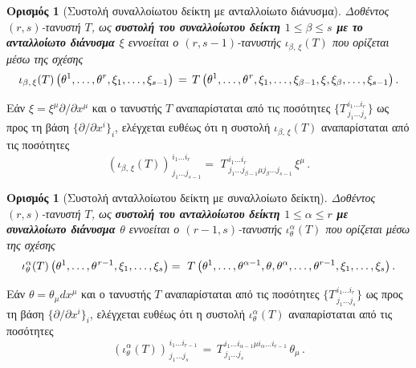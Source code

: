\documentclass[11pt,a4paper,twoside,openright]{book}
\newtheorem{definition}[lemma]{Ορισμός}
\begin{document}
\begin{definition}[Συστολή συναλλοίωτου δείκτη με ανταλλοίωτο διάνυσμα]
	\label{def:interior-product}
Δοθέντος $(r,s)$-τανυστή $T$, ως \textbf{συστολή του συναλλοίωτου δείκτη $1 \le \beta \le s$ με το ανταλλοίωτο διάνυσμα $\xi$} εννοείται ο $(r, s-1)$-τανυστής $\iota_{\beta,\,\xi}(T)$ που ορίζεται μέσω της σχέσης
\begin{equation}\label{eq:interior-product}
\iota_{\beta,\,\xi}(T)
\left(
\theta^1, \dots, \theta^r, \xi_1, \dots, \xi_{s-1}
\right)
\,=\,
T
\left(
\theta^1, \dots, \theta^{\hspace{.5pt}r},
\xi_1, \dots, \xi_{\beta-1}, \xi, \xi_{\beta}, \dots, \xi_{s-1}
\right).
\end{equation}
\end{definition}
\noindent
Εάν $\xi = \xi^\mu \partial/\partial x^\mu$ και ο τανυστής $T$ αναπαρίσταται από τις ποσότητες $\{T^{\,i_1 \dots i_r}_{\,j_1 \dots j_s}\}$ ως προς τη βάση $\{\partial/\partial x^i\}_i$, ελέγχεται ευθέως ότι η συστολή
$\iota_{\beta,\,\xi}(T)$ αναπαρίσταται από τις ποσότητες
\begin{equation}\label{eq:interior-product-representation}
(\iota_{\beta,\,\xi}(T))^{\,i_1 \dots i_r}_{\,j_1 \dots j_{s-1}}
=\,\,
T^{\,i_1 \dots i_r}_{\,j_1 \dots j_{\beta-1} \mu j_{\beta} \dots j_{s-1}}
\,
\xi^\mu\,.
\end{equation}

\begin{definition}[Συστολή ανταλλοίωτου δείκτη με συναλλοίωτο δείκτη]
	\label{def:interior-product-dual}
Δοθέντος $(r,s)$-τανυστή $T$, ως \textbf{συστολή του ανταλλοίωτου δείκτη $1 \le \alpha \le r$ με συναλλοίωτο διάνυσμα $\theta$} εννοείται ο $(r-1, s)$-τανυστής $\iota^\alpha_\theta(T)$ που ορίζεται μέσω της σχέσης
\begin{equation}\label{eq:interior-product-dual-representation}
\iota^\alpha_\theta(T)
\left(
\theta^1, \dots, \theta^{\hspace{.5pt}r-1}, \xi_1, \dots, \xi_s
\right)
=\,\,
T
\left(
\theta^1, \dots, \theta^{\alpha-1}, \theta, \theta^{\alpha}, \dots, \theta^{r-1},
\xi_1, \dots, \xi_s
\right).
\end{equation}
\end{definition}
\noindent
Εάν $\theta = \theta_\mu dx^\mu$ και ο τανυστής $T$ αναπαρίσταται από τις ποσότητες $\{T^{\,i_1 \dots i_r}_{\,j_1 \dots j_s}\}$ ως προς τη βάση $\{\partial/\partial x^i\}_i$, ελέγχεται ευθέως ότι η συστολή $\iota^\alpha_\theta(T)$ αναπαρίσταται από τις ποσότητες
\begin{equation}\label{eq:interior-product-dual-representation}
\left(\iota^\alpha_\theta(T)\right)^{\,i_1 \dots i_{r-1}}_{\,j_1 \dots j_s}
\,=\,
T^{\,i_1 \dots i_{\alpha-1} \mu i_{\alpha} \dots i_{r-1}}_{\,j_1 \dots j_s}
\,
\theta_\mu\,.
\end{equation}
\end{document}

